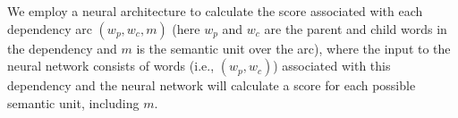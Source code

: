 %	
%	
%	
%	
%	
%	
%	
We employ a neural architecture to calculate the score associated with each dependency arc $(w_p, w_c, m)$ (here $w_p$ and $w_c$ are the parent and child words in the dependency and $m$ is the semantic unit over the arc), where the input to the neural network consists of  words (i.e., $(w_p, w_c)$) associated with this dependency and the neural network will calculate a score for each possible semantic unit, including $m$.
